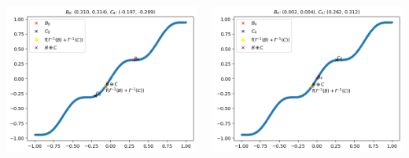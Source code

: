 \documentclass{beamer}
\begin{document}
            \begin{frame}
                \begin{columns}
                    \begin{column}{0.5\textwidth}
                        \centering
                        \includegraphics[width=0.9\linewidth]{./images/1.png}
                    \end{column}%
                    \begin{column}{0.5\textwidth}
                        \centering
                        \includegraphics[width=0.9\linewidth]{./images/2.png}
                    \end{column}
                \end{columns}
            \end{frame}
\end{document}
